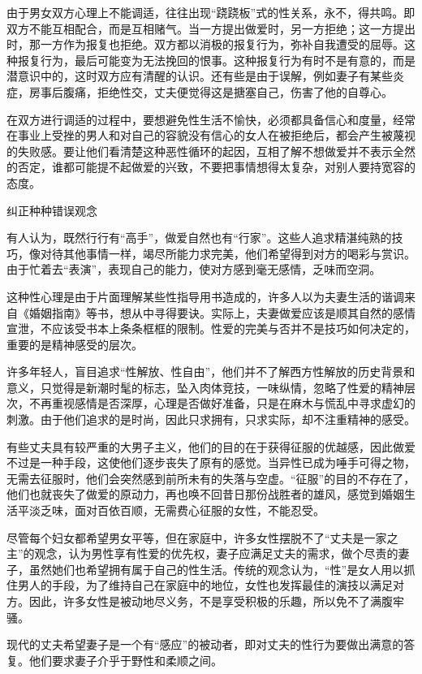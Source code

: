 \documentclass[12pt,UTF8,openany]{ctexbook}
\begin{document}
由于男女双方心理上不能调适，往往出现“跷跷板”式的性关系，永不，得共鸣。即双方不能互相配合，而是互相赌气。当一方提出做爱时，另一方拒绝；这一方提出时，那一方作为报复也拒绝。双方都以消极的报复行为，弥补自我遭受的屈辱。这种报复行为，最后可能变为无法挽回的恨事。这种报复行为有时不是有意的，而是潜意识中的，这时双方应有清醒的认识。还有些是由于误解，例如妻子有某些炎症，房事后腹痛，拒绝性交，丈夫便觉得这是搪塞自己，伤害了他的自尊心。

在双方进行调适的过程中，要想避免性生活不愉快，必须都具备信心和度量，经常在事业上受挫的男人和对自己的容貌没有信心的女人在被拒绝后，都会产生被蔑视的失败感。要让他们看清楚这种恶性循环的起因，互相了解不想做爱并不表示全然的否定，谁都可能提不起做爱的兴致，不要把事情想得太复杂，对别人要持宽容的态度。





纠正种种错误观念


有人认为，既然行行有“高手”，做爱自然也有“行家”。这些人追求精湛纯熟的技巧，像对待其他事情一样，竭尽所能力求完美，他们希望得到对方的喝彩与赏识。由于忙着去“表演”，表现自己的能力，使对方感到毫无感情，乏味而空洞。

这种性心理是由于片面理解某些性指导用书造成的，许多人以为夫妻生活的谐调来自《婚姻指南》等书，想从中寻得要诀。实际上，夫妻做爱应该是顺其自然的感情宣泄，不应该受书本上条条框框的限制。性爱的完美与否并不是技巧如何决定的，重要的是精神感受的层次。

许多年轻人，盲目追求“性解放、性自由”，他们并不了解西方性解放的历史背景和意义，只觉得是新潮时髦的标志，坠入肉体竞技，一味纵情，忽略了性爱的精神层次，不再重视感情是否深厚，心理是否做好准备，只是在麻木与慌乱中寻求虚幻的刺激。由于他们追求的是时尚，因此只求拥有，只求实际，却不注重精神的感受。

有些丈夫具有较严重的大男子主义，他们的目的在于获得征服的优越感，因此做爱不过是一种手段，这使他们逐步丧失了原有的感觉。当异性已成为唾手可得之物，无需去征服时，他们会突然感到前所未有的失落与空虚。“征服”的目的不存在了，他们也就丧失了做爱的原动力，再也唤不回昔日那份战胜者的雄风，感觉到婚姻生活平淡乏味，面对百依百顺，无需费心征服的女性，不能忍受。

尽管每个妇女都希望男女平等，但在家庭中，许多女性摆脱不了“丈夫是一家之主”的观念，认为男性享有性爱的优先权，妻子应满足丈夫的需求，做个尽责的妻子，虽然她们也希望拥有属于自己的性生活。传统的观念认为，“性”是女人用以抓住男人的手段，为了维持自己在家庭中的地位，女性也发挥最佳的演技以满足对方。因此，许多女性是被动地尽义务，不是享受积极的乐趣，所以免不了满腹牢骚。

现代的丈夫希望妻子是一个有“感应”的被动者，即对丈夫的性行为要做出满意的答复。他们要求妻子介乎于野性和柔顺之间。
\end{document}
